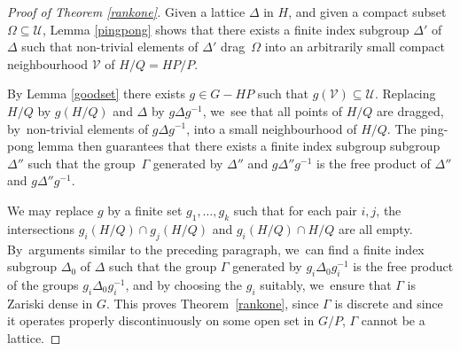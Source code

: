 \documentclass[JEP,XML,SOM,Unicode,published]{cedram}
\theoremstyle{definition}
\begin{document}
\begin{proof}[Proof of Theorem \ref{rankone}]
Given a lattice $\Delta$ in $H$, and given a compact subset $\Omega
\subseteq{\mathcal U}$, Lemma \ref{pingpong} shows that there exists a
finite index subgroup $\Delta '$ of $\Delta $ such that non-trivial
elements of $\Delta '$ drag~$\Omega $ into an arbitrarily small
compact neighbourhood ${\mathcal V}$ of $H/Q=HP/P$.

By Lemma \ref{goodset} there exists $g\in G-HP$ such that
$g({\mathcal V})\subseteq{\mathcal U}$. Replacing $H/Q$ by $g(H/Q)$
and $\Delta $ by $g\Delta g^{-1}$, we~see that all points of $H/Q$ are
dragged, by~non-trivial elements of $g\Delta g^{-1}$, into a small
neighbourhood of $H/Q$. The ping-pong lemma then guarantees that
there exists a finite index subgroup subgroup $\Delta ''$ such that
the group~$\Gamma $ generated by $\Delta ''$ and $g\Delta ''g^{-1}$ is the free product of $\Delta''$ and $g\Delta ''g^{-1}$.

We may replace $g$ by a finite set $g_1,\dots, g_k$ such that for each
pair $i,j$, the intersections $g_i(H/Q)\cap g_j(H/Q)$ and
$g_i(H/Q)\cap H/Q$ are all empty. By~arguments similar to the
preceding paragraph, we~can find a finite index subgroup $\Delta_0$
of $\Delta $ such that the group $\Gamma $ generated by $g_i \Delta_0
g_i ^{-1}$ is the free product of the groups $g_i\Delta_0 g_i^{-1}$,
and by choosing the $g_i$ suitably, we~ensure that $\Gamma $ is
Zariski dense in $G$. This proves Theorem~\ref{rankone},
since $\Gamma $ is
discrete and since it operates properly discontinuously on some open
set in $G/P$, $\Gamma $ cannot be a lattice.
\end{proof}



\end{document}
